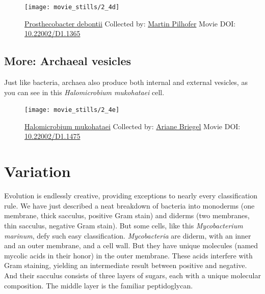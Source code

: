 \documentclass[]{tufte-book}
\begin{document}
\begin{figure}
\texttt{[image: movie\_stills/2\_4d]} \caption[\protect\hyperlink{tree}{Prosthecobacter debontii} Collected
by: \protect\hyperlink{martin_pilhofer}{Martin Pilhofer} Movie DOI:
\href{https://doi.org/10.22002/D1.1365}{10.22002/D1.1365}]{\protect\hyperlink{tree}{Prosthecobacter debontii} Collected
by: \protect\hyperlink{martin_pilhofer}{Martin Pilhofer} Movie DOI:
\href{https://doi.org/10.22002/D1.1365}{10.22002/D1.1365}}\label{fig:2-4d}
\end{figure}

\hypertarget{Archaeal_vesicles}{\subsection*{More: Archaeal
vesicles}\label{Archaeal_vesicles}}

Just like bacteria, archaea also produce both internal and external
vesicles, as you can see in this \emph{Halomicrobium mukohataei} cell.





\begin{figure}
\texttt{[image: movie\_stills/2\_4e]} \caption[\protect\hyperlink{tree}{Halomicrobium mukohataei} Collected
by: \protect\hyperlink{ariane_briegel}{Ariane Briegel} Movie DOI:
\href{https://doi.org/10.22002/D1.1475}{10.22002/D1.1475}]{\protect\hyperlink{tree}{Halomicrobium mukohataei} Collected
by: \protect\hyperlink{ariane_briegel}{Ariane Briegel} Movie DOI:
\href{https://doi.org/10.22002/D1.1475}{10.22002/D1.1475}}\label{fig:2-4e}
\end{figure}

\section{Variation}\label{variation}

Evolution is endlessly creative, providing exceptions to nearly every
classification rule. We have just described a neat breakdown of bacteria
into monoderms (one membrane, thick sacculus, positive Gram stain) and
diderms (two membranes, thin sacculus, negative Gram stain). But some
cells, like this \emph{Mycobacterium marinum}, defy such easy
classification. \emph{Mycobacteria} are diderm, with an inner and an
outer membrane, and a cell wall. But they have unique molecules (named
mycolic acids in their honor) in the outer membrane. These acids
interfere with Gram staining, yielding an intermediate result between
positive and negative. And their sacculus consists of three layers of
sugars, each with a unique molecular composition. The middle layer is
the familiar peptidoglycan.
\end{document}
